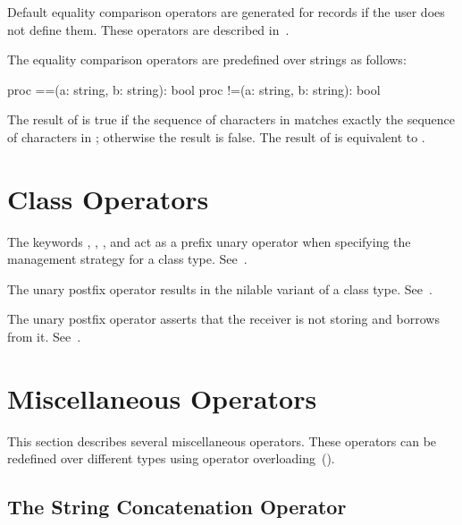 Default equality comparison operators are generated for records if the
user does not define them.  These operators are described
in~.

The equality comparison operators are predefined over strings as
follows:
\begin{chapel}
proc ==(a: string, b: string): bool
proc !=(a: string, b: string): bool
\end{chapel}
The result of  is true if the sequence of characters
in  matches exactly the sequence of characters in ;
otherwise the result is false.  The result of  is
equivalent to .

\section{Class Operators}
\label{Class_Operators}

The keywords , , , and
 act as a prefix unary operator when specifying the management
strategy for a class type. See~.

The unary postfix operator  results in the nilable variant of a
class type. See~.

The unary postfix operator \chpl{!} asserts that the receiver is not
storing  and borrows from it. See~.

\section{Miscellaneous Operators}
\label{Miscellaneous_Operators}

This section describes several miscellaneous operators.  These
operators can be redefined over different types using operator
overloading~().

\subsection{The String Concatenation Operator}
\label{The_String_Concatenation_Operator}

